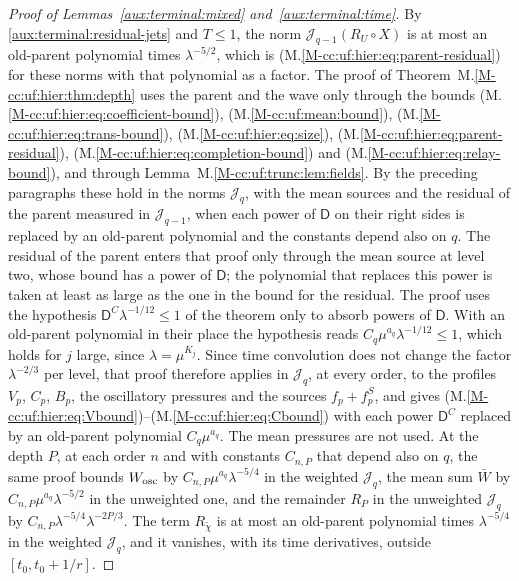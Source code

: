 \documentclass[11pt]{amsart}
\numberwithin{equation}{section}
\begin{document}
\begin{proof}[Proof of Lemmas~\ref{aux:terminal:mixed} and~\ref{aux:terminal:time}]
By \eqref{aux:terminal:residual-jets} and $T\le1$, the norm
$\mathcal J_{q-1}(R_U\circ X)$ is at most an old-parent polynomial
times $\lambda^{-5/2}$, which is
\textup{(M.\ref{M-cc:uf:hier:eq:parent-residual})} for these norms with
that polynomial as a factor.
The proof of Theorem~M.\ref{M-cc:uf:hier:thm:depth} uses the parent and
the wave only through the bounds
\textup{(M.\ref{M-cc:uf:hier:eq:coefficient-bound})},
\textup{(M.\ref{M-cc:uf:mean:bound})},
\textup{(M.\ref{M-cc:uf:hier:eq:trans-bound})},
\textup{(M.\ref{M-cc:uf:hier:eq:size})},
\textup{(M.\ref{M-cc:uf:hier:eq:parent-residual})},
\textup{(M.\ref{M-cc:uf:hier:eq:completion-bound})} and
\textup{(M.\ref{M-cc:uf:hier:eq:relay-bound})}, and through
Lemma~M.\ref{M-cc:uf:trunc:lem:fields}. By the preceding paragraphs
these hold in the norms $\mathcal J_q$, with the mean sources and the
residual of the parent measured in $\mathcal J_{q-1}$, when each power
of $\mathsf D$ on their right sides is replaced by an old-parent
polynomial and the constants depend also on $q$. The residual of the
parent enters that proof only through the mean source at level two,
whose bound has a power of $\mathsf D$; the polynomial that replaces
this power is taken at least as large as the one in the bound for the
residual. The proof uses the hypothesis
$\mathsf D^C\lambda^{-1/12}\le1$ of the theorem only to absorb powers
of $\mathsf D$. With an old-parent polynomial in their place the
hypothesis reads $C_q\mu^{a_q}\lambda^{-1/12}\le1$, which holds for
$j$ large, since $\lambda=\mu^{K_j}$. Since time convolution does not change the factor
$\lambda^{-2/3}$ per level, that proof therefore
applies in $\mathcal J_q$, at every order, to the profiles $V_p$, $C_p$,
$B_p$, the
oscillatory pressures and the sources $f_p+f_p^S$, and gives
\textup{(M.\ref{M-cc:uf:hier:eq:Vbound})}--\textup{(M.\ref{M-cc:uf:hier:eq:Cbound})}
with each power $\mathsf D^C$ replaced by an old-parent polynomial
$C_q\mu^{a_q}$. The mean pressures are
not used.
At the depth $P$, at each order $n$ and with constants $C_{n,P}$ that
depend also on $q$, the same proof bounds $W_{\rm osc}$ by
$C_{n,P}\mu^{a_q}\lambda^{-5/4}$ in the weighted $\mathcal J_q$, the mean
sum $\bar W$ by
$C_{n,P}\mu^{a_q}\lambda^{-5/2}$ in the
unweighted one, and the remainder $R_P$ in the unweighted
$\mathcal J_q$ by
$C_{n,P}\lambda^{-5/4}\lambda^{-2P/3}$. The term
$R_{\widetilde\chi}$ is at most an old-parent polynomial times
$\lambda^{-5/4}$ in the weighted $\mathcal J_q$, and it vanishes, with
its time derivatives, outside $[t_0,t_0+1/r]$.


\end{proof}
\end{document}
